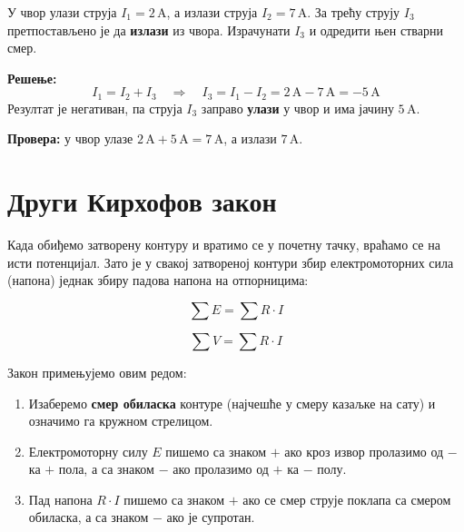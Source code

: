 \documentclass[12pt]{article}
\begin{document}
\begin{primer}
У чвор улази струја $I_1 = 2\,\text{A}$, а излази струја $I_2 = 7\,\text{A}$.
За трећу струју $I_3$ претпостављено је да \textbf{излази} из чвора.
Израчунати $I_3$ и одредити њен стварни смер.

\begin{center}
\end{center}

\textbf{Решење:}
\[
I_1 = I_2 + I_3
\quad\Longrightarrow\quad
I_3 = I_1 - I_2 = 2\,\text{A} - 7\,\text{A} = -5\,\text{A}
\]
Резултат је негативан, па струја $I_3$ заправо \textbf{улази} у чвор и има
јачину $5\,\text{A}$.

\textbf{Провера:} у чвор улазе $2\,\text{A} + 5\,\text{A} = 7\,\text{A}$, а
излази $7\,\text{A}$.
\end{primer}

\section{Други Кирхофов закон}

Када обиђемо затворену контуру и вратимо се у почетну тачку, враћамо се на
исти потенцијал. Зато је у свакој затвореној контури збир електромоторних
сила (напона) једнак збиру падова напона на отпорницима:

\begin{kljucno}
\[
\sum E = \sum R \cdot I
\]
\end{kljucno}

\begin{kljucno}
\[
\sum V = \sum R \cdot I
\]
\end{kljucno}

Закон примењујемо овим редом:
\begin{enumerate}
    \item Изаберемо \textbf{смер обиласка} контуре (најчешће у смеру казаљке
          на сату) и означимо га кружном стрелицом.
    \item Електромоторну силу $E$ пишемо са знаком $+$ ако кроз извор
          пролазимо од $-$ ка $+$ пола, а са знаком $-$ ако пролазимо од $+$ ка
          $-$ полу.
    \item Пад напона $R \cdot I$ пишемо са знаком $+$ ако се смер струје
          поклапа са смером обиласка, а са знаком $-$ ако је супротан.
\end{enumerate}
\end{document}
